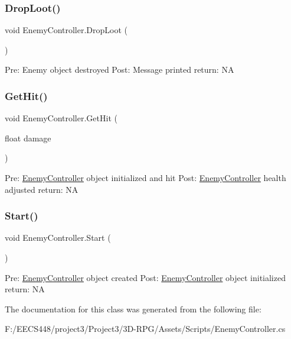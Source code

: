 \subsubsection{\texorpdfstring{Drop\+Loot()}{DropLoot()}}
{\footnotesize\ttfamily void Enemy\+Controller.\+Drop\+Loot (\begin{DoxyParamCaption}{ }\end{DoxyParamCaption})\hspace{0.3cm}{\ttfamily [private]}}

Pre\+: Enemy object destroyed Post\+: Message printed return\+: NA \mbox{\label{class_enemy_controller_a1aefc89669c41a6353ecf463c937af07}} 
\subsubsection{\texorpdfstring{Get\+Hit()}{GetHit()}}
{\footnotesize\ttfamily void Enemy\+Controller.\+Get\+Hit (\begin{DoxyParamCaption}\item[{float}]{damage }\end{DoxyParamCaption})}

Pre\+: \hyperlink{class_enemy_controller}{Enemy\+Controller} object initialized and hit Post\+: \hyperlink{class_enemy_controller}{Enemy\+Controller} health adjusted return\+: NA \mbox{\label{class_enemy_controller_aef5af22782327b22749e5632ad7467fb}} 
\subsubsection{\texorpdfstring{Start()}{Start()}}
{\footnotesize\ttfamily void Enemy\+Controller.\+Start (\begin{DoxyParamCaption}{ }\end{DoxyParamCaption})\hspace{0.3cm}{\ttfamily [private]}}

Pre\+: \hyperlink{class_enemy_controller}{Enemy\+Controller} object created Post\+: \hyperlink{class_enemy_controller}{Enemy\+Controller} object initialized return\+: NA 

The documentation for this class was generated from the following file\+:\begin{DoxyCompactItemize}
\item 
F\+:/\+E\+E\+C\+S448/project3/\+Project3/3\+D-\/\+R\+P\+G/\+Assets/\+Scripts/Enemy\+Controller.\+cs\end{DoxyCompactItemize}

